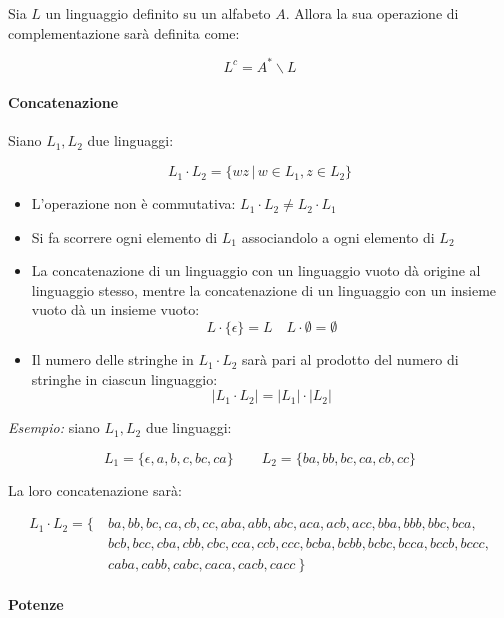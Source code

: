 \documentclass[italian, 10pt]{article}
\begin{document}
Sia \(L\) un linguaggio definito su un alfabeto \(A\).
Allora la sua operazione di complementazione sarà definita come:

\[ L^c = A^\ast \backslash L \]

\paragraph{Concatenazione}

Siano \(L_1, L_2\) due linguaggi:

\[ L_1 \cdot L_2 = \{ w z \, | \, w \in L_1, z \in L_2 \} \]

\begin{itemize}
  \item L'operazione non è commutativa: \( L_1 \cdot L_2 \neq L_2 \cdot L_1 \)
  \item Si fa scorrere ogni elemento di \(L_1\) associandolo a ogni elemento di \(L_2\)
  \item La concatenazione di un linguaggio con un linguaggio vuoto dà origine al linguaggio stesso, mentre la concatenazione di un linguaggio con un insieme vuoto dà un insieme vuoto:
        \[ L \cdot \{\epsilon\} = L \quad L \cdot \emptyset = \emptyset \]
  \item Il numero delle stringhe in \(L_1 \cdot L_2\) sarà pari al prodotto del numero di stringhe in ciascun linguaggio:
        \[ | L_1 \cdot L_2 | = |L_1| \cdot |L_2| \]

\end{itemize}

\bigskip
\textit{Esempio:} siano \(L_1, L_2\) due linguaggi:

\[ L_1 = \{ \epsilon, a, b, c, bc, ca\} \qquad L_2 = \{ ba, bb, bc, ca, cb, cc \} \]

La loro concatenazione sarà:

\begin{align*}
  L_1 \cdot L_2 = \{ \  & ba, bb, bc, ca, cb, cc, aba, abb, abc, aca, acb, acc, bba, bbb, bbc, bca,    \\
                        & bcb, bcc, cba, cbb, cbc, cca, ccb, ccc, bcba, bcbb, bcbc, bcca, bccb, bccc , \\
                        & caba, cabb, cabc, caca, cacb, cacc \ \}
\end{align*}

\paragraph{Potenze}
\label{par:potenze-di-linguaggi}
\end{document}
